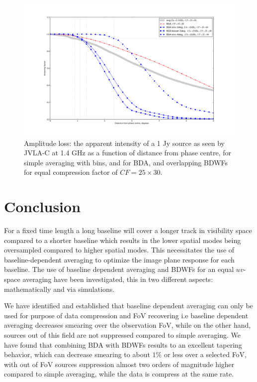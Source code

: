 \documentclass[useAMS,usenatbib]{mn2e}
\begin{document}
\begin{figure}
\centering
\includegraphics[width=1.2\textwidth, angle =90]{./Figures/suppression-25-2-5MHx-bda.png}
\caption{Amplitude loss: the apparent intensity of a 1 Jy source as seen by JVLA-C at 1.4 GHz as a function of distance from phase centre, for simple averaging with  bins, and for BDA, and overlapping BDWFs for equal 
compression factor of $CF=25\times 30$.}\label{fig:bda-sn-bessel-2ge}
\end{figure}


\section{Conclusion}
 For a fixed time length a long baseline will cover a
longer track in visibility space compared to a shorter baseline which results in
the lower spatial modes being oversampled compared to higher spatial modes.
This necessitates the use of baseline-dependent averaging to optimize the
image plane response for each baseline. The use of baseline dependent 
averaging and BDWFs for an equal $uv$-space averaging have been investigated, this in two different aspects: 
mathematically and  via simulations.

We have identified and established that baseline dependent averaging 
can only be used for purpose of data compression and FoV recovering i.e baseline dependent averaging
decreases smearing over the observation FoV, while on the other hand, sources out of this field are 
not suppressed compared to simple averaging. 
We have found that combining BDA with BDWFs results to an  excellent tapering behavior,
which can decrease smearing to about $1\%$ or less over a selected  FoV, with  out of FoV sources suppression
almost two orders of magnitude higher compared to simple averaging, while the data is compress at the same rate.
\end{document}
